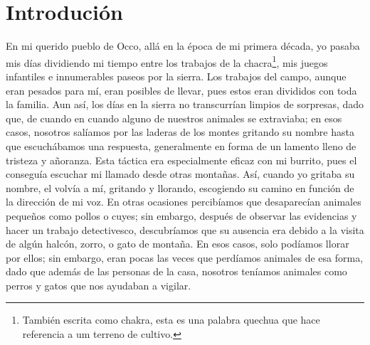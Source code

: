 \cleardoublepage
\newpage
{}
\chapter*{Introdución} %

En mi querido pueblo de Occo, allá en la época de mi primera década, yo pasaba mis días dividiendo mi tiempo entre los trabajos de la chacra\footnote{También escrita como chakra, esta es una palabra quechua que hace referencia a um terreno de cultivo.}, mis juegos infantiles e innumerables paseos por la sierra.
Los trabajos del campo, aunque eran pesados para mí, eran posibles de llevar, pues estos eran divididos con toda la familia. 
Aun así, los días en la sierra no transcurrían limpios de sorpresas, dado que, de cuando en cuando alguno de nuestros animales se extraviaba; en esos casos, nosotros salíamos por las laderas de los montes gritando su nombre hasta que escuchábamos una respuesta, generalmente en forma de un lamento lleno de tristeza y añoranza.
Esta táctica era especialmente eficaz con mi burrito, pues el conseguía escuchar mi llamado desde otras montañas. Así, cuando yo gritaba su nombre, el volvía a mí, gritando y llorando, escogiendo su camino en función de la dirección de mi voz.  
En otras ocasiones percibíamos que desaparecían animales pequeños como pollos o cuyes; sin embargo, después de observar las evidencias y hacer un trabajo detectivesco, descubríamos que su ausencia era debido a la visita de algún halcón, zorro, o gato de montaña.
En esos casos, solo podíamos llorar por ellos; sin embargo, eran pocas las veces que perdíamos animales de esa forma, dado que además de las personas de la casa, nosotros teníamos animales como perros y gatos que nos ayudaban a vigilar.

